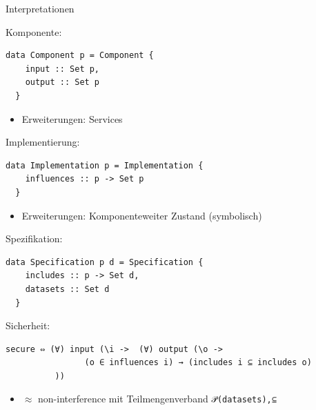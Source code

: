 \documentclass[18pt]{beamer}
\newcommand{\kit}[1]{\textcolor{kit-green100}{#1}}
\begin{document}
\begin{frame}[fragile,t]{Interpretationen}
\begin{overprint}
\begin{minipage}{5cm}
\kit{Komponente:}
\begin{verbatim}
data Component p = Component {
    input :: Set p,
    output :: Set p
  }
\end{verbatim}
\end{minipage}
\begin{minipage}{6cm}
\begin{itemize}
  \item Erweiterungen: Services
\end{itemize}
\end{minipage}
\begin{minipage}{5cm}
\kit{Implementierung:}
\begin{verbatim}
data Implementation p = Implementation {
    influences :: p -> Set p
  }
\end{verbatim}
\end{minipage}
\begin{minipage}{6cm}
\begin{itemize}
  \item Erweiterungen: Komponenteweiter Zustand (symbolisch)
\end{itemize}
\end{minipage}
\kit{Spezifikation:}
\begin{minipage}[t]{8cm}
\begin{verbatim}
data Specification p d = Specification {
    includes :: p -> Set d,
    datasets :: Set d
  }
\end{verbatim}
\end{minipage}

\kit{Sicherheit:}
\begin{minipage}[t]{8cm}
\begin{verbatim}
secure ⇔ (∀) input (\i ->  (∀) output (\o ->
                (o ∈ influences i) → (includes i ⊆ includes o)
          ))
\end{verbatim}
\end{minipage}
\begin{itemize}
  \item $\approx$ non-interference mit Teilmengenverband \texttt{𝒫(datasets),⊆}
\end{itemize}
\begin{center}

\end{center}
\end{overprint}

\end{frame}
\end{document}
